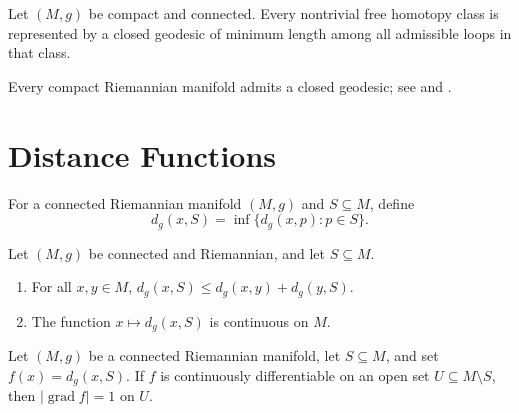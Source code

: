 \begin{proposition}
\label{prop:existence-closed-geodesics}
Let $(M,g)$ be compact and connected. Every nontrivial free homotopy class is
represented by a closed geodesic of minimum length among all admissible loops
in that class.
\end{proposition}

Every compact Riemannian manifold admits a closed geodesic; see
\cite{Jos17} and \cite{Kli95}.
\section{Distance Functions}

For a connected Riemannian manifold $(M,g)$ and $S\subseteq M$, define
\[
d_g(x,S)=\inf\{d_g(x,p):p\in S\}.
\]

\begin{lemma}
\label{lem:distance-triangle-inequality-and-continuity}

Let $(M,g)$ be connected and Riemannian, and let $S\subseteq M$.
\begin{enumerate}[label=(\alph*)]
\item For all $x,y\in M$,
$d_g(x,S)\leq d_g(x,y)+d_g(y,S)$.
\item The function $x\mapsto d_g(x,S)$ is continuous on $M$.
\end{enumerate}
\end{lemma}

\begin{theorem}
\label{thm:distance-to-subset-unit-gradient}


Let $(M,g)$ be a connected Riemannian manifold, let $S\subseteq M$, and set
$f(x)=d_g(x,S)$. If $f$ is continuously differentiable on an open set
$U\subseteq M\setminus S$, then
$|\operatorname{grad}f|=1$ on $U$.
\end{theorem}

